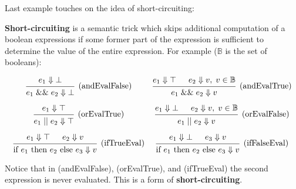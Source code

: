Last example touches on the idea of short-circuiting:
\begin{Def}

    \label{def:short-circuiting}
    \noindent
    \textbf{Short-circuiting} is a semantic trick which skips additional computation of a boolean expressions 
    if some former part of the expression is sufficient to determine the value of the entire expression.
    For example ($\mathbb{B}$ is the set of booleans):
    
    \vspace{-1em}
  
        \[
        \begin{matrix}
        \begin{prooftree}
            \hypo{e_1 \Downarrow \bot}
            \infer1[(andEvalFalse)]{e_1 \;\&\&\; e_2 \Downarrow \bot}
        \end{prooftree}
        &
        \begin{prooftree}
            \hypo{e_1 \Downarrow \top}
            \hypo{e_2 \Downarrow v,\; v \in \mathbb{B}}
            \infer2[(andEvalTrue)]{e_1 \;\&\&\; e_2 \Downarrow v}
        \end{prooftree}
        \vspace{1em}\\ 

        \begin{prooftree}
            \hypo{e_1 \Downarrow \top}
            \infer1[(orEvalTrue)]{e_1 \;||\; e_2 \Downarrow \top}
        \end{prooftree}
        &
        \begin{prooftree}
            \hypo{e_1 \Downarrow \bot}
            \hypo{e_2 \Downarrow v,\; v \in \mathbb{B}}
            \infer2[(orEvalFalse)]{e_1 \;||\; e_2 \Downarrow v}
        \end{prooftree}
        \vspace{1em} \\ 

        \begin{prooftree}
            \hypo{e_1 \Downarrow \top}
            \hypo{e_2 \Downarrow v}
            \infer2[(ifTrueEval)]{\text{if } e_1 \text{ then } e_2 \text{ else } e_3 \Downarrow v}
        \end{prooftree}
        &
        \begin{prooftree}
            \hypo{e_1 \Downarrow \bot}
            \hypo{e_3 \Downarrow v}
            \infer2[(ifFalseEval)]{\text{if } e_1 \text{ then } e_2 \text{ else } e_3 \Downarrow v}
        \end{prooftree}
        \end{matrix}
        \]

    \noindent
    Notice that in (andEvalFalse), (orEvalTrue), and (ifTrueEval) the second expression is never evaluated. This is a form of \textbf{short-circuiting}.
    \end{Def}
   
